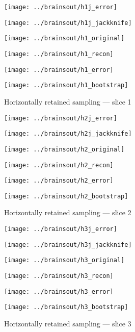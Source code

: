 \documentclass[review,supplement,onefignum,onetabnum,juq]{siamonline181217}
\begin{document}
\begin{figure}
\begin{centering}

\parbox{\imsize}{\texttt{[image: ../brainsout/h1j\_error]}}
\parbox{\imsize}{\texttt{[image: ../brainsout/h1j\_jackknife]}}

\vspace{\vertsep}

\parbox{\imsize}{\texttt{[image: ../brainsout/h1\_original]}}
\parbox{\imsize}{\texttt{[image: ../brainsout/h1\_recon]}}

\vspace{\vertsep}

\parbox{\imsize}{\texttt{[image: ../brainsout/h1\_error]}}
\parbox{\imsize}{\texttt{[image: ../brainsout/h1\_bootstrap]}}

\end{centering}
\caption{Horizontally retained sampling --- slice 1}
\end{figure}


\begin{figure}
\begin{centering}

\parbox{\imsize}{\texttt{[image: ../brainsout/h2j\_error]}}
\parbox{\imsize}{\texttt{[image: ../brainsout/h2j\_jackknife]}}

\vspace{\vertsep}

\parbox{\imsize}{\texttt{[image: ../brainsout/h2\_original]}}
\parbox{\imsize}{\texttt{[image: ../brainsout/h2\_recon]}}

\vspace{\vertsep}

\parbox{\imsize}{\texttt{[image: ../brainsout/h2\_error]}}
\parbox{\imsize}{\texttt{[image: ../brainsout/h2\_bootstrap]}}

\end{centering}
\caption{Horizontally retained sampling --- slice 2}
\end{figure}


\begin{figure}
\begin{centering}

\parbox{\imsize}{\texttt{[image: ../brainsout/h3j\_error]}}
\parbox{\imsize}{\texttt{[image: ../brainsout/h3j\_jackknife]}}

\vspace{\vertsep}

\parbox{\imsize}{\texttt{[image: ../brainsout/h3\_original]}}
\parbox{\imsize}{\texttt{[image: ../brainsout/h3\_recon]}}

\vspace{\vertsep}

\parbox{\imsize}{\texttt{[image: ../brainsout/h3\_error]}}
\parbox{\imsize}{\texttt{[image: ../brainsout/h3\_bootstrap]}}

\end{centering}
\caption{Horizontally retained sampling --- slice 3}
\end{figure}
\end{document}
